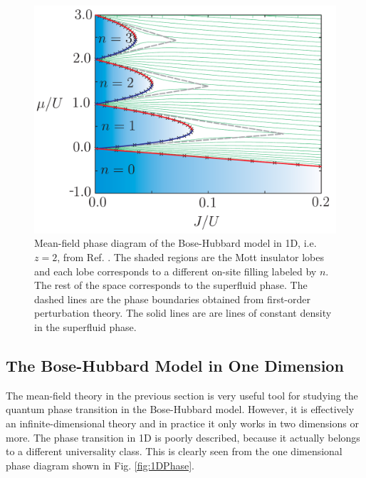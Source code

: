 \begin{figure}
  \centering
  \includegraphics[width=0.8\linewidth]{BHPhase}
  \caption[Mean-Field Bose-Hubbard Phase Diagram]{Mean-field phase
    diagram of the Bose-Hubbard model in 1D, i.e.~ $z = 2$, from
    Ref. \cite{StephenThesis}. The shaded regions are the Mott
    insulator lobes and each lobe corresponds to a different on-site
    filling labeled by $n$. The rest of the space corresponds to the
    superfluid phase. The dashed lines are the phase boundaries
    obtained from first-order perturbation theory. The solid lines are
    are lines of constant density in the superfluid
    phase. \label{fig:BHPhase}}
\end{figure}

\subsection{The Bose-Hubbard Model in One Dimension}

The mean-field theory in the previous section is very useful tool for
studying the quantum phase transition in the Bose-Hubbard
model. However, it is effectively an infinite-dimensional theory and
in practice it only works in two dimensions or more. The phase
transition in 1D is poorly described, because it actually belongs to a
different universality class. This is clearly seen from the one
dimensional phase diagram shown in Fig. \ref{fig:1DPhase}.

